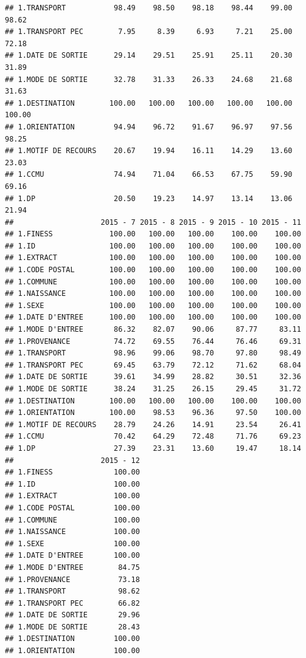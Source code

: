 \documentclass[]{article}
\begin{document}
\begin{verbatim}
## 1.TRANSPORT           98.49    98.50    98.18    98.44    99.00    98.62
## 1.TRANSPORT PEC        7.95     8.39     6.93     7.21    25.00    72.18
## 1.DATE DE SORTIE      29.14    29.51    25.91    25.11    20.30    31.89
## 1.MODE DE SORTIE      32.78    31.33    26.33    24.68    21.68    31.63
## 1.DESTINATION        100.00   100.00   100.00   100.00   100.00   100.00
## 1.ORIENTATION         94.94    96.72    91.67    96.97    97.56    98.25
## 1.MOTIF DE RECOURS    20.67    19.94    16.11    14.29    13.60    23.03
## 1.CCMU                74.94    71.04    66.53    67.75    59.90    69.16
## 1.DP                  20.50    19.23    14.97    13.14    13.06    21.94
##                    2015 - 7 2015 - 8 2015 - 9 2015 - 10 2015 - 11
## 1.FINESS             100.00   100.00   100.00    100.00    100.00
## 1.ID                 100.00   100.00   100.00    100.00    100.00
## 1.EXTRACT            100.00   100.00   100.00    100.00    100.00
## 1.CODE POSTAL        100.00   100.00   100.00    100.00    100.00
## 1.COMMUNE            100.00   100.00   100.00    100.00    100.00
## 1.NAISSANCE          100.00   100.00   100.00    100.00    100.00
## 1.SEXE               100.00   100.00   100.00    100.00    100.00
## 1.DATE D'ENTREE      100.00   100.00   100.00    100.00    100.00
## 1.MODE D'ENTREE       86.32    82.07    90.06     87.77     83.11
## 1.PROVENANCE          74.72    69.55    76.44     76.46     69.31
## 1.TRANSPORT           98.96    99.06    98.70     97.80     98.49
## 1.TRANSPORT PEC       69.45    63.79    72.12     71.62     68.04
## 1.DATE DE SORTIE      39.61    34.99    28.82     30.51     32.36
## 1.MODE DE SORTIE      38.24    31.25    26.15     29.45     31.72
## 1.DESTINATION        100.00   100.00   100.00    100.00    100.00
## 1.ORIENTATION        100.00    98.53    96.36     97.50    100.00
## 1.MOTIF DE RECOURS    28.79    24.26    14.91     23.54     26.41
## 1.CCMU                70.42    64.29    72.48     71.76     69.23
## 1.DP                  27.39    23.31    13.60     19.47     18.14
##                    2015 - 12
## 1.FINESS              100.00
## 1.ID                  100.00
## 1.EXTRACT             100.00
## 1.CODE POSTAL         100.00
## 1.COMMUNE             100.00
## 1.NAISSANCE           100.00
## 1.SEXE                100.00
## 1.DATE D'ENTREE       100.00
## 1.MODE D'ENTREE        84.75
## 1.PROVENANCE           73.18
## 1.TRANSPORT            98.62
## 1.TRANSPORT PEC        66.82
## 1.DATE DE SORTIE       29.96
## 1.MODE DE SORTIE       28.43
## 1.DESTINATION         100.00
## 1.ORIENTATION         100.00

\end{verbatim}
\end{document}
